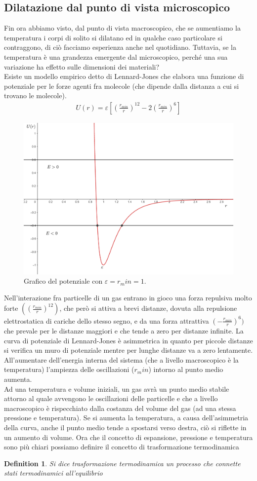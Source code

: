 \documentclass[10pt,a4paper]{article}
\newtheorem{definition}{Definition}
\begin{document}
\subsection{Dilatazione dal punto di vista microscopico}
Fin ora abbiamo visto, dal punto di vista macroscopico, che se aumentiamo la temperatura i corpi di solito si dilatano ed in qualche caso particolare si contraggono, di ciò facciamo esperienza anche nel quotidiano. Tuttavia, se la temperatura è una grandezza emergente dal microscopico, perché una sua variazione ha effetto sulle dimensioni dei materiali?\\
Esiste un modello empirico detto di Lennard-Jones che elabora una funzione di potenziale per le forze agenti fra molecole (che dipende dalla distanza a cui si trovano le molecole). 
\begin{align*} 
	U(r) = \varepsilon[(\frac{r_{min}}{r})^{12}-2(\frac{r_{min}}{r})^6]
\end{align*} 
\begin{figure}[h!]
	\centering
	\includegraphics[width=0.6\linewidth]{../images/../images/Lennard-Jones_model}
	\caption{Grafico del potenziale con $\varepsilon =r_min = 1$.}
	\label{fig:lennard-jonesmodel}
\end{figure}
\FloatBarrier
Nell'interazione fra particelle di un gas entrano in gioco una forza repulsiva molto forte $((\frac{r_{min}}{r})^{12})$, che però si attiva a brevi distanze, dovuta alla repulsione elettrostatica di cariche dello stesso segno, e da una forza attrattiva $(-\frac{r_{min}}{r})^6)$ che prevale per le distanze maggiori e che tende a zero per distanze infinite. La curva di potenziale di Lennard-Jones è asimmetrica in quanto per piccole distanze si verifica un muro di potenziale mentre per lunghe distanze va a zero lentamente. All'aumentare dell'energia interna del sistema (che a livello macroscopico è la temperatura) l'ampiezza delle oscillazioni ($r_min$) intorno al punto medio aumenta.\\
Ad una temperatura e volume iniziali, un gas avrà un punto medio stabile attorno al quale avvengono le oscillazioni delle particelle e che a livello macroscopico è rispecchiato dalla costanza del volume del gas (ad una stessa pressione e temperatura). Se si aumenta la temperatura, a causa dell'asimmetria della curva, anche il punto medio tende a spostarsi verso destra, ciò si riflette in un aumento di volume. Ora che il concetto di espansione, pressione e temperatura sono più chiari possiamo definire il concetto di trasformazione termodinamica
\begin{definition}
	Si dice trasformazione termodinamica un processo che connette stati termodinamici all'equilibrio
\end{definition}
\end{document}
